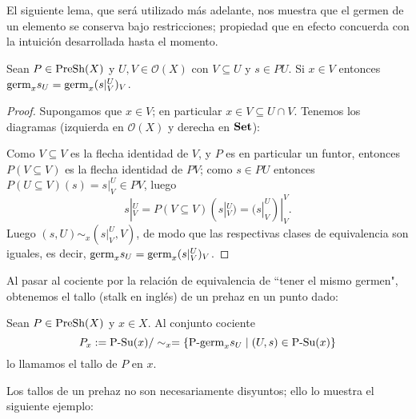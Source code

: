 El siguiente lema, que será utilizado más adelante, nos muestra que el germen de un elemento se conserva bajo restricciones; propiedad que en efecto concuerda con la intuición desarrollada hasta el momento.
\begin{Lema}
   Sean $P\in\normalfont{\text{PreSh}}(X)$ y $U,V\in\mathcal{O}(X)$ con $V\subseteq U$ y $s\in PU$. Si $x\in V$ entonces $\normalfont{\text{germ}}_{x}s_{U}=\normalfont{\text{germ}}_{x}(s|^{U}_{V})_{V}$.
\end{Lema}
\begin{proof}
   Supongamos que $x\in V$; en particular $x\in V\subseteq U\cap V$. Tenemos los diagramas (izquierda en $\mathcal{O}(X)$ y derecha en $\normalfont{\textbf{Set}}$):
   
   Como $V\subseteq V$ es la flecha identidad de $V$, y $P$ es en particular un funtor, entonces $P(V\subseteq V)$ es la flecha identidad de $PV$; como $s\in PU$ entonces $P(U\subseteq V)(s)=s|^{U}_{V}\in PV$, luego 
   $$
   s|^{U}_{V}=P(V\subseteq V)(s|^{U}_{V})=(s|^{U}_{V})|^{V}_{V}.
   $$
   Luego $(s,U)\sim_{x}(s|^{U}_{V},V)$, de modo que las respectivas clases de equivalencia son iguales, es decir, $\normalfont{\text{germ}}_{x}s_{U}=\normalfont{\text{germ}}_{x}(s|^{U}_{V})_{V}$.
\end{proof}
Al pasar al cociente por la relación de equivalencia de ``tener el mismo germen", obtenemos el tallo (stalk en inglés) de un prehaz en un punto dado:
\begin{Def}
   Sean $P\in\normalfont{\text{PreSh}}(X)$ y $x\in X$. Al conjunto cociente
   $$
   P_{x}:=\normalfont{\text{P-Su}}(x)/\sim_{x}=\left\lbrace \normalfont{\text{P-germ}}_{x}s_{U}\mid (U,s)\in\normalfont{\text{P-Su}}(x)\right\rbrace
   $$
   lo llamamos el tallo de $P$ en $x$.
\end{Def}
Los tallos de un prehaz no son necesariamente disyuntos; ello lo muestra el siguiente ejemplo:
